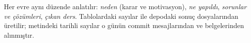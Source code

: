 Her evre aynı düzende anlatılır: \emph{neden} (karar ve motivasyon), \emph{ne yapıldı}, \emph{sorunlar ve çözümleri}, \emph{çıkan ders}. Tablolardaki sayılar  ile depodaki sonuç dosyalarından üretilir; metindeki tarihli sayılar o günün commit mesajlarından ve belgelerinden alınmıştır.
